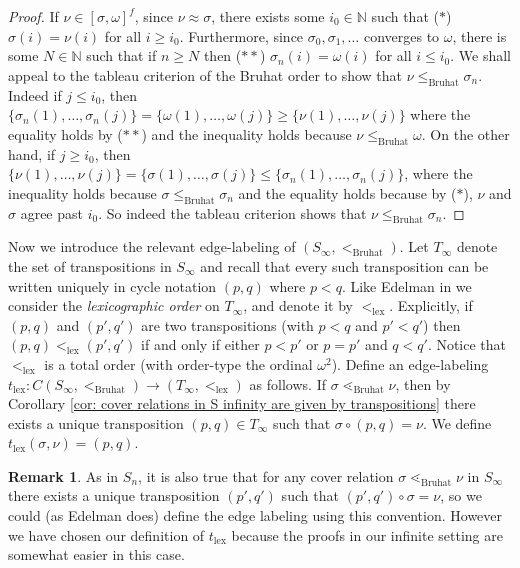 \documentclass[oneside,11pt,reqno]{amsart}
\newcommand{\nn}{\ensuremath{\mathbb{N}}}
\theoremstyle{definition}
\newtheorem{remark}{Remark}
\newtheorem{proof techniques}{Proof Techniques}
\begin{document}
\begin{proof}
    If $\nu \in [\sigma , \omega]^f$, since $\nu \approx \sigma$, there exists some $i_0 \in \nn$ such that ($\ast$) $\sigma(i) = \nu(i)$ for all $i \geq i_0$. Furthermore, since $\sigma_0 , \sigma_1, \ldots$ converges to $\omega$, there is some $N \in \nn$ such that if $n \geq N$ then ($\ast \ast$) $\sigma_n(i) =  \omega(i)$ for all $i \leq i_0$. We shall appeal to the tableau criterion of the Bruhat order to show that $\nu \leq_\text{Bruhat} \sigma_n$. Indeed if $j \leq i_0$, then $\{ \sigma_n(1) , \ldots , \sigma_n(j) \} = \{ \omega(1) , \ldots, \omega(j) \} \geq \{ \nu(1) , \ldots , \nu(j) \}$ where the equality holds by ($\ast \ast$) and the inequality holds because $\nu \leq_\text{Bruhat} \omega$. On the other hand, if $j \geq i_0$, then $\{ \nu(1), \ldots, \nu(j) \} = \{ \sigma(1), \ldots, \sigma(j) \} \leq \{\sigma_n(1) , \ldots, \sigma_n(j) \}$, where the inequality holds because $\sigma \leq_\text{Bruhat} \sigma_n$ and the equality holds because by ($\ast$), $\nu$ and $\sigma$ agree past $i_0$. So indeed the tableau criterion shows that $\nu \leq_\text{Bruhat} \sigma_n$.
\end{proof}

Now we introduce the relevant edge-labeling of $(S_\infty , <_\text{Bruhat})$. Let $T_\infty$ denote the set of transpositions in $S_\infty$ and recall that every such transposition can be written uniquely in cycle notation $(p , q)$ where $p < q$. Like Edelman in \cite{edelman1981bruhat} we consider the \emph{lexicographic order} on $T_\infty$, and denote it by $<_\text{lex}$. Explicitly, if $(p , q)$ and $(p' , q')$ are two transpositions (with $p < q$ and $p' < q'$) then $(p , q) <_\text{lex} (p', q')$ if and only if either $p < p'$ or $p = p'$ and $q < q'$. Notice that $<_\text{lex}$ is a total order (with order-type the ordinal $\omega^2$). Define an edge-labeling $t_\text{lex} : C(S_\infty , <_\text{Bruhat}) \to (T_\infty , <_\text{lex})$ as follows. If $\sigma \lessdot_\text{Bruhat} \nu$, then by Corollary \ref{cor: cover relations in S infinity are given by transpositions} there exists a unique transposition $(p , q) \in T_\infty$ such that $\sigma \circ (p , q) = \nu$. We define $t_\text{lex}(\sigma , \nu) = (p , q)$. 

\begin{remark}
    As in $S_n$, it is also true that for any cover relation $\sigma \lessdot_\text{Bruhat} \nu$ in $S_\infty$ there exists a unique transposition $(p', q')$ such that $(p' , q') \circ \sigma = \nu$, so we could (as Edelman does) define the edge labeling using this convention. However we have chosen our definition of $t_\text{lex}$ because the proofs in our infinite setting are somewhat easier in this case. 
\end{remark}
\end{document}
